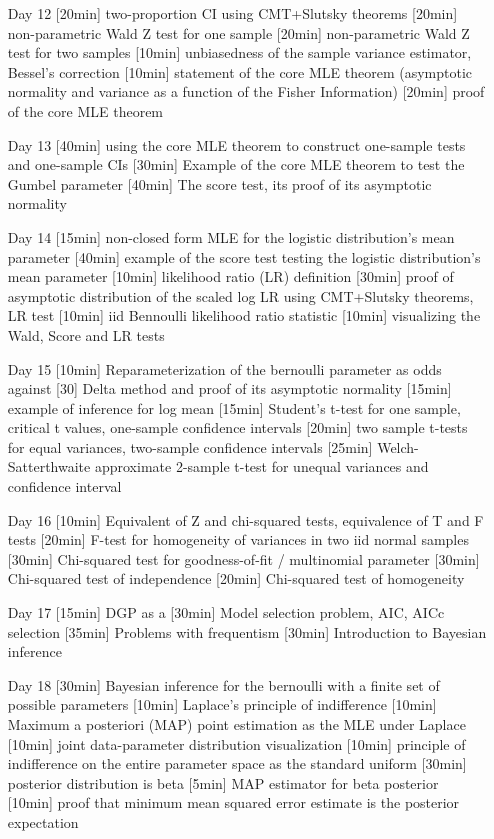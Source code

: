 \begin{enumerate}
\item[Day 12] [20min] two-proportion CI using CMT+Slutsky theorems [20min] non-parametric Wald Z test for one sample [20min] non-parametric Wald Z test for two samples [10min] unbiasedness of the sample variance estimator, Bessel's correction [10min] statement of the core MLE theorem (asymptotic normality and variance as a function of the Fisher Information) [20min] proof of the core MLE theorem

\item[Day 13] [40min] using the core MLE theorem to construct one-sample tests and one-sample CIs [30min] Example of the core MLE theorem to test the Gumbel parameter [40min] The score test, its proof of its asymptotic normality 

\item[Day 14] [15min] non-closed form MLE for the logistic distribution's mean parameter [40min] example of the score test testing the logistic distribution's mean parameter [10min] likelihood ratio (LR) definition [30min] proof of asymptotic distribution of the scaled log LR using CMT+Slutsky theorems, LR test [10min] iid Bennoulli likelihood ratio statistic [10min] visualizing the Wald, Score and LR tests

\item[Day 15] [10min] Reparameterization of the bernoulli parameter as odds against [30] Delta method and proof of its asymptotic normality [15min] example of inference for log mean [15min] Student's t-test for one sample, critical t values, one-sample confidence intervals [20min] two sample t-tests for equal variances, two-sample confidence intervals [25min] Welch-Satterthwaite approximate 2-sample t-test for unequal variances and confidence interval

\item[Day 16] [10min] Equivalent of Z and chi-squared tests, equivalence of T and F tests [20min] F-test for homogeneity of variances in two iid normal samples [30min] Chi-squared test for goodness-of-fit / multinomial parameter [30min] Chi-squared test of independence [20min] Chi-squared test of homogeneity

\item[Day 17] [15min] DGP as a  [30min] Model selection problem, AIC, AICc selection [35min] Problems with frequentism [30min] Introduction to Bayesian inference

\item[Day 18] [30min] Bayesian inference for the bernoulli with a finite set of possible parameters [10min] Laplace's principle of indifference [10min] Maximum a posteriori (MAP) point estimation as the MLE under Laplace [10min] joint data-parameter distribution visualization [10min] principle of indifference on the entire parameter space as the standard uniform [30min] posterior distribution is beta [5min] MAP estimator for beta posterior [10min] proof that minimum mean squared error estimate is the posterior expectation



\end{enumerate}
